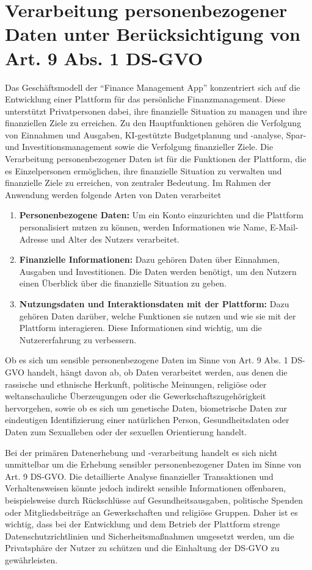 \chapter{Verarbeitung personenbezogener Daten unter Berücksichtigung von Art. 9 Abs. 1 DS-GVO}

Das Geschäftsmodell der \enquote{Finance Management App} konzentriert sich auf die Entwicklung einer Plattform für das persönliche Finanzmanagement. Diese unterstützt Privatpersonen dabei, ihre finanzielle Situation zu managen und ihre finanziellen Ziele zu erreichen. Zu den Hauptfunktionen gehören die Verfolgung von Einnahmen und Ausgaben, KI-gestützte Budgetplanung und -analyse, Spar- und Investitionsmanagement sowie die Verfolgung finanzieller Ziele. Die Verarbeitung personenbezogener Daten ist für die Funktionen der Plattform, die es Einzelpersonen ermöglichen, ihre finanzielle Situation zu verwalten und finanzielle Ziele zu erreichen, von zentraler Bedeutung. Im Rahmen der Anwendung werden folgende Arten von Daten verarbeitet
\begin{enumerate}
    \item \textbf{Personenbezogene Daten:} 
    Um ein Konto einzurichten und die Plattform personalisiert nutzen zu können, werden Informationen wie Name, E-Mail-Adresse und Alter des Nutzers verarbeitet.
    \item \textbf{Finanzielle Informationen:} 
    Dazu gehören Daten über Einnahmen, Ausgaben und Investitionen. Die Daten werden benötigt, um den Nutzern einen Überblick über die finanzielle Situation zu geben.
    \item \textbf{Nutzungsdaten und Interaktionsdaten mit der Plattform:} 
    Dazu gehören Daten darüber, welche Funktionen sie nutzen und wie sie mit der Plattform interagieren. Diese Informationen sind wichtig, um die Nutzererfahrung zu verbessern.

\end{enumerate}

Ob es sich um sensible personenbezogene Daten im Sinne von Art. 9 Abs. 1 DS-GVO handelt, hängt davon ab, ob Daten verarbeitet werden, aus denen die rassische und ethnische Herkunft, politische Meinungen, religiöse oder weltanschauliche Überzeugungen oder die Gewerkschaftszugehörigkeit hervorgehen, sowie ob es sich um genetische Daten, biometrische Daten zur eindeutigen Identifizierung einer natürlichen Person, Gesundheitsdaten oder Daten zum Sexualleben oder der sexuellen Orientierung handelt.

Bei der primären Datenerhebung und -verarbeitung handelt es sich nicht unmittelbar um die Erhebung sensibler personenbezogener Daten im Sinne von Art. 9 DS-GVO. Die detaillierte Analyse finanzieller Transaktionen und Verhaltensweisen könnte jedoch indirekt sensible Informationen offenbaren, beispielsweise durch Rückschlüsse auf Gesundheitsausgaben, politische Spenden oder Mitgliedsbeiträge an Gewerkschaften und religiöse Gruppen. Daher ist es wichtig, dass bei der Entwicklung und dem Betrieb der Plattform strenge Datenschutzrichtlinien und Sicherheitsmaßnahmen umgesetzt werden, um die Privatsphäre der Nutzer zu schützen und die Einhaltung der DS-GVO zu gewährleisten.